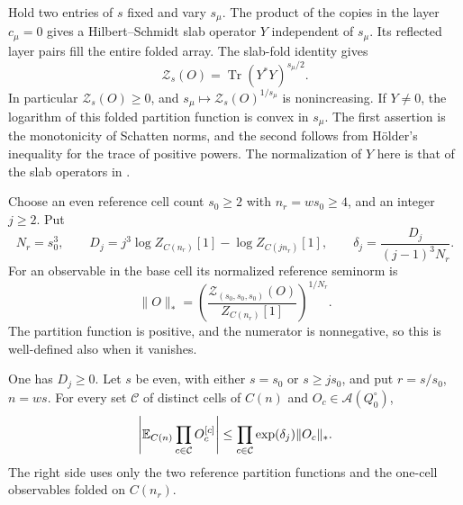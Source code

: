 Hold two entries of $s$ fixed and vary $s_\mu$.
The product of the copies in the layer $c_\mu=0$ gives
a Hilbert--Schmidt slab operator $Y$ independent of $s_\mu$.
Its reflected layer pairs fill the entire folded array.
The slab-fold identity \cite[Proposition~4.2, (66)]{ChamberLattice} gives
\begin{equation}\label{eq:transfer-fold-trace}
 \mathcal Z_s(O)=\operatorname{Tr}(Y^*Y)^{s_\mu/2}.
\end{equation}
In particular $\mathcal Z_s(O)\ge0$, and
$s_\mu\mapsto\mathcal Z_s(O)^{1/s_\mu}$ is nonincreasing.
If $Y\ne0$, the logarithm of this folded partition function
is convex in $s_\mu$. The first assertion is the monotonicity
of Schatten norms, and the second follows from H\"older's
inequality for the trace of positive powers.
The normalization of $Y$ here is that of the slab operators
in \cite[\S4.3]{ChamberLattice}.

Choose an even reference cell count $s_0\ge2$ with
$n_r=ws_0\ge4$, and an integer $j\ge2$. Put
\begin{equation}\label{eq:transfer-reference-data}
 N_r=s_0^3,\qquad
 D_j=j^3\log Z_{C(n_r)}[1]-\log Z_{C(jn_r)}[1],
 \qquad \delta_j=\frac{D_j}{(j-1)^3N_r}.
\end{equation}
For an observable in the base cell its normalized reference
seminorm is
\begin{equation}\label{eq:transfer-reference-seminorm}
 \|O\|_*=
 \left(\frac{\mathcal Z_{(s_0,s_0,s_0)}(O)}
                    {Z_{C(n_r)}[1]}\right)^{1/N_r}.
\end{equation}
The partition function is positive, and the numerator is
nonnegative, so this is well-defined also when it vanishes.

\begin{proposition}\label{prop:transfer-general}
One has $D_j\ge0$. Let $s$ be even, with either $s=s_0$
or $s\ge js_0$, and put $r=s/s_0$, $n=ws$.
For every set $\mathcal C$ of distinct cells of $C(n)$ and
$O_c\in\mathcal A(Q_0^\circ)$,
\begin{equation}\label{eq:transfer-general}
 \left|\mathbb E_{C(n)}\prod_{c\in\mathcal C}O_c^{[c]}\right|
                    \le\prod_{c\in\mathcal C}\exp(\delta_j)\|O_c\|_*.
\end{equation}
The right side uses only the two reference partition functions
and the one-cell observables folded on $C(n_r)$.
\end{proposition}

